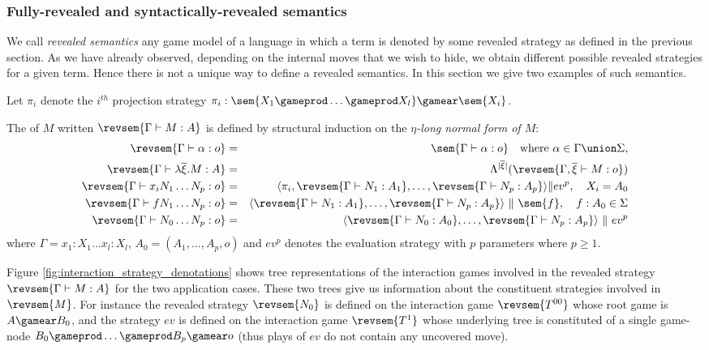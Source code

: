 \subsubsection{Fully-revealed and syntactically-revealed semantics}

We call \emph{revealed semantics} any game model of a language in which a term is denoted by some revealed strategy as defined in the previous section. As we have already observed, depending on the internal moves that we wish to hide, we obtain different possible revealed strategies for a given term. Hence there is not a unique way to define a revealed semantics. In this section we give two examples of such semantics.

Let $\pi_i$ denote the $i^{th}$ projection strategy $\pi_i : \sem{X_1 \gameprod
\ldots \gameprod X_l} \gamear \sem{X_i}$.

\begin{definition}
\label{dfn:fully_revealed_semantics}
The  of $M$ written $\revsem{\Gamma \vdash M : A}$ is defined by structural induction on the \emph{$\eta$-long normal form of $M$}:
\begin{eqnarray*}
\revsem{\Gamma \vdash \alpha : o} &=&
\sem{\Gamma \vdash \alpha : o} \quad \mbox{where } \alpha \in \Gamma \union \Sigma,\\
\revsem{\Gamma \vdash \lambda \overline{\xi} . M  : A} &=& \Lambda^{|\overline{\xi}|}(\revsem{\Gamma, \overline{\xi} \vdash M : o })  \\
\revsem{\Gamma  \vdash x_i N_1 \ldots N_p :o} &=& \langle \pi_i, \revsem{\Gamma \vdash N_1 : A_1}, \ldots, \revsem{\Gamma \vdash N_p : A_p}  \rangle \| ev^p, \quad X_i = A_0 \\
\revsem{\Gamma \vdash f N_1 \ldots N_p : o} &=& \langle \revsem{\Gamma \vdash N_1 : A_1}, \ldots, \revsem{\Gamma \vdash N_p : A_p} \rangle\ \|\ \sem{f}, \quad f : A_0 \in \Sigma \\
\revsem{\Gamma \vdash N_0 \ldots N_p : o} &=& \langle \revsem{\Gamma \vdash N_0 : A_0}, \ldots, \revsem{\Gamma \vdash N_p : A_p}  \rangle\ \|\ ev^p
\end{eqnarray*}
where $\Gamma = x_1 : X_1 \ldots x_l : X_l$, $A_0 =
(A_1,\ldots,A_p,o)$ and $ev^p$ denotes the evaluation strategy with
$p$ parameters where $p\geq 1$.
\end{definition}

Figure \ref{fig:interaction_strategy_denotations} shows tree representations of the interaction games involved in the revealed strategy $\revsem{\Gamma \vdash M : A}$ for the two application cases. These two trees give us information about the constituent strategies involved in $\revsem{M}$. For instance the revealed strategy $\revsem{N_0}$ is defined on the interaction game $\revsem{T^{00}}$ whose root game is $A \gamear B_0$, and the strategy $ev$ is defined on the interaction game $\revsem{T^1}$ whose underlying tree is constituted of a single game-node $B_0 \gameprod \ldots \gameprod B_p \gamear o$ (thus plays of $ev$ do not contain any uncovered move).

